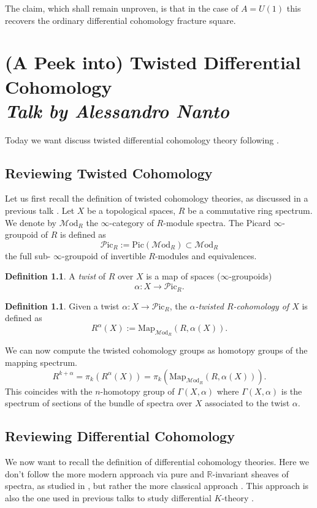 \documentclass[a4paper]{book}
\newcommand{\lM}{\mathcal{M}}
\newcommand{\lP}{\mathcal{P}}
\newcommand{\bR}{\mathbb{R}}
\newcommand{\Mod}{\lM\mathrm{od}} %
\newcommand{\Pic}{\lP\mathrm{ic}} %
\theoremstyle{definition}
\newtheorem{definition}[equation]{Definition}
\theoremstyle{remark}
\numberwithin{equation}{section}
\begin{document}
The claim, which shall remain unproven, is that in the case of $A = U(1)$ this recovers the ordinary differential cohomology fracture square.

\chapter{(A Peek into) Twisted Differential Cohomology \texorpdfstring{\\}{ } \normalsize \emph{Talk by Alessandro Nanto}}

Today we want discuss twisted differential cohomology theory following \cite{bunkegepner2021diffktheory}.

\section{Reviewing Twisted Cohomology}
Let us first recall the definition of twisted cohomology theories, as discussed in a previous talk \cite{berkenhagen2025diffcoh8}. Let $X$ be a topological spaces, $R$ be a commutative ring spectrum. We denote by $\Mod_R$ the $\infty$-category of $R$-module spectra. The Picard $\infty$-groupoid of $R$ is defined as 
\[\Pic_R := \mathrm{Pic}(\Mod_R) \subset \Mod_R\]
the full sub- $\infty$-groupoid of invertible $R$-modules and equivalences.

\begin{definition}
A \emph{twist} of $R$ over $X$ is a map of spaces ($\infty$-groupoids)
\[\alpha : X \to \Pic_R.\]
\end{definition}

\begin{definition}
Given a twist $\alpha : X \to \Pic_R$, the \emph{$\alpha$-twisted $R$-cohomology of $X$} is defined as
\[R^\alpha(X) := \mathrm{Map}_{\Mod_R}(R, \alpha(X)).\]
\end{definition}

We can now compute the twisted cohomology groups as homotopy groups of the mapping spectrum.
\[R^{k + \alpha} = \pi_k(R^\alpha(X)) = \pi_k\left(\mathrm{Map}_{\Mod_R}(R, \alpha(X))\right).\]
This coincides with the $n$-homotopy group of $\Gamma(X, \alpha)$ where $\Gamma(X, \alpha)$ is the spectrum of sections of the bundle of spectra over $X$ associated to the twist $\alpha$.

\section{Reviewing Differential Cohomology}
We now want to recall the definition of differential cohomology theories. Here we don't follow the more modern approach via pure and $\bR$-invariant sheaves of spectra, as studied in \cite{bunkenikolausvoelkl2016diffcoh}, but rather the more classical approach \cite{hopkinssinger2005diffcoh}. This approach is also the one used in previous talks to study differential $K$-theory \cite{ludewig2025diffcoh7}.
\end{document}
